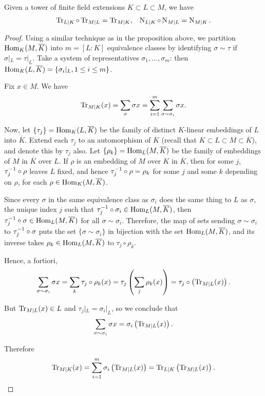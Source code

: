 \begin{cor}
	Given a tower of finite field extensions $K\subset L\subset M$, we have
	\begin{align*}
		\operatorname{Tr}_{L\mid K} \circ \operatorname{Tr}_{M\mid L} = \operatorname{Tr}_{M\mid K}, & & \operatorname{N}_{L\mid K} \circ \operatorname{N}_{M\mid L} = \operatorname{N}_{M\mid K}.
	\end{align*}
\end{cor}
\begin{proof}
	Using a similar technique as in the proposition above, we partition $\text{Hom}_K(M,\overline{K})$ into $m=[L:K]$ equivalence classes by identifying $\sigma\sim\tau$ if $\sigma|_L = \tau|_L$. Take a system of representatives $\sigma_1,\dots,\sigma_m$: then $\text{Hom}_K(L,\overline{K}) = \{\sigma_i|_L , 1\leq i \leq m\}$.

	Fix $x\in M$. We have
	\begin{align*}
		\operatorname{Tr}_{M\mid K}(x) = \sum_\sigma \sigma x = \sum_{i=1}^m \sum_{\sigma\sim\sigma_i} \sigma x.
	\end{align*}

	Now, let $\{\tau_j\} = \text{Hom}_K(L,\overline{K})$ be the family of distinct $K$-linear embeddings of $L$ into $\overline{K}$. Extend each $\tau_j$ to an automorphism of $\overline{K}$ (recall that $K\subset L\subset M \subset \overline{K}$), and denote this by $\tau_j$ also. Let $\{\rho_k\}=\text{Hom}_L(M,\overline{K})$ be the family of embeddings of $M$ in $\overline{K}$ over $L$. If $\rho$ is an embedding of $M$ over $K$ in $\overline{K}$, then for some $j$, $\tau_j^{-1}\circ\rho$ leaves $L$ fixed, and hence $\tau_j^{-1}\circ\rho=\rho_k$ for some $j$ and some $k$ depending on $\rho$, for each $\rho\in\text{Hom}_K(M,\overline{K})$.

	Since every $\sigma$ in the same equivalence class as $\sigma_i$ does the same thing to $L$ as $\sigma$, the unique index $j$ such that $\tau_j^{-1}\circ\sigma_i\in\text{Hom}_L(M,\overline{K})$, then $\tau_j^{-1}\circ\sigma\in\text{Hom}_L(M,\overline{K})$ for all $\sigma\sim\sigma_i$. Therefore, the map of sets sending $\sigma\sim\sigma_i$ to $\tau_j^{-1}\circ\sigma$ puts the set $\{\sigma\sim\sigma_i\}$ in bijection with the set $\text{Hom}_L(M,\overline{K})$, and its inverse takes $\rho_k\in\text{Hom}_L(M,\overline{K})$ to $\tau_j\circ\rho_k$.

	Hence, a fortiori,
	\[
		\sum_{\sigma\sim\sigma_i} \sigma x = \sum_k \tau_j\circ\rho_k(x) = \tau_j\left(\sum_j\rho_k(x)\right) = \tau_j\circ\left(\operatorname{Tr}_{M\mid L}(x)\right).
	\]

	But $\operatorname{Tr}_{M\mid L}(x)\in L$ and $\tau_j|_L=\sigma_i|_L$, so we conclude that
	\[
		\sum_{\sigma\sim\sigma_i} \sigma x = \sigma_i\left(\operatorname{Tr}_{M\mid L}(x)\right).
	\]

	Therefore
	\[
		\operatorname{Tr}_{M\mid K}(x) = \sum_{i=1}^m \sigma_i\left(\operatorname{Tr}_{M\mid L}(x)\right) = \operatorname{Tr}_{L\mid K}\left(\operatorname{Tr}_{M\mid L}(x)\right).
	\]

\end{proof}


